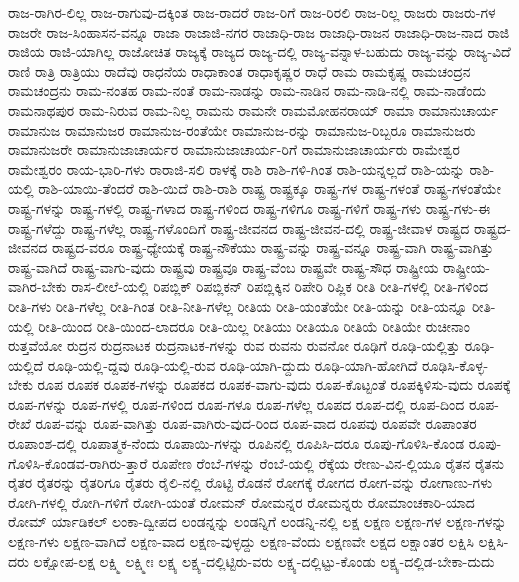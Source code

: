 {ರಾಜ-ರಾಗಿರ-ಲಿಲ್ಲ
ರಾಜ-ರಾಗುವು-ದಕ್ಕಿಂತ
ರಾಜ-ರಾದರೆ
ರಾಜ-ರಿಗೆ
ರಾಜ-ರಿರಲಿ
ರಾಜ-ರಿಲ್ಲ
ರಾಜರು
ರಾಜರು-ಗಳ
ರಾಜರೇ
ರಾಜ-ಸಿಂಹಾಸನ-ವನ್ನೂ
ರಾಜಾ
ರಾಜಾಜಿ-ನಗರ
ರಾಜಾಧಿ-ರಾಜ
ರಾಜಾಧಿ-ರಾಜನ
ರಾಜಾಧಿ-ರಾಜ-ನಾದ
ರಾಜಿ
ರಾಜಿಯ
ರಾಜಿ-ಯಾಗಿಲ್ಲ
ರಾಜೋಚಿತ
ರಾಜ್ಯಕ್ಕೆ
ರಾಜ್ಯದ
ರಾಜ್ಯ-ದಲ್ಲಿ
ರಾಜ್ಯ-ವನ್ನಾಳ-ಬಹುದು
ರಾಜ್ಯ-ವನ್ನು
ರಾಜ್ಯ-ವಿದೆ
ರಾಣಿ
ರಾತ್ರಿ
ರಾತ್ರಿಯು
ರಾದೆವು
ರಾಧನೆಯ
ರಾಧಾಕಾಂತ
ರಾಧಾಕೃಷ್ಣರ
ರಾಧೆ
ರಾಮ
ರಾಮಕೃಷ್ಣ
ರಾಮಚಂದ್ರನ
ರಾಮಚಂದ್ರನು
ರಾಮ-ನಂತಹ
ರಾಮ-ನಂತೆ
ರಾಮ-ನಾಡನ್ನು
ರಾಮ-ನಾಡಿನ
ರಾಮ-ನಾಡಿ-ನಲ್ಲಿ
ರಾಮ-ನಾಡೆಂದು
ರಾಮನಾಥಪುರ
ರಾಮ-ನಿರುವ
ರಾಮ-ನಿಲ್ಲ
ರಾಮನು
ರಾಮನೇ
ರಾಮಮೋಹನರಾಯ್
ರಾಮಾ
ರಾಮಾನುಚಾರ್ಯ
ರಾಮಾನುಜ
ರಾಮಾನುಜರ
ರಾಮಾನುಜ-ರಂತೆಯೇ
ರಾಮಾನುಜ-ರನ್ನು
ರಾಮಾನುಜ-ರಿಬ್ಬರೂ
ರಾಮಾನುಜರು
ರಾಮಾನುಜರೇ
ರಾಮಾನುಜಾಚಾರ್ಯರ
ರಾಮಾನುಜಾಚಾರ್ಯ-ರಿಗೆ
ರಾಮಾನುಜಾಚಾರ್ಯರು
ರಾಮೇಶ್ವರ
ರಾಮೇಶ್ವರಂ
ರಾಯ-ಭಾರಿ-ಗಳು
ರಾರಾಜಿ-ಸಲಿ
ರಾಳಕ್ಕೆ
ರಾಶಿ
ರಾಶಿ-ಗಳಿ-ಗಿಂತ
ರಾಶಿ-ಯನ್ನಲ್ಲದೆ
ರಾಶಿ-ಯನ್ನು
ರಾಶಿ-ಯಲ್ಲಿ
ರಾಶಿ-ಯಾಯಿ-ತೆಂದರೆ
ರಾಶಿ-ಯಿದೆ
ರಾಶಿ-ರಾಶಿ
ರಾಷ್ಟ್ರ
ರಾಷ್ಟ್ರಕ್ಕೂ
ರಾಷ್ಟ್ರ-ಗಳ
ರಾಷ್ಟ್ರ-ಗಳಂತೆ
ರಾಷ್ಟ್ರ-ಗಳಂತೆಯೇ
ರಾಷ್ಟ್ರ-ಗಳನ್ನು
ರಾಷ್ಟ್ರ-ಗಳಲ್ಲಿ
ರಾಷ್ಟ್ರ-ಗಳಾದ
ರಾಷ್ಟ್ರ-ಗಳಿಂದ
ರಾಷ್ಟ್ರ-ಗಳಿಗೂ
ರಾಷ್ಟ್ರ-ಗಳಿಗೆ
ರಾಷ್ಟ್ರ-ಗಳು
ರಾಷ್ಟ್ರ-ಗಳು-ಈ
ರಾಷ್ಟ್ರ-ಗಳೆದ್ದು
ರಾಷ್ಟ್ರ-ಗಳೆಲ್ಲ
ರಾಷ್ಟ್ರ-ಗಳೊಂದಿಗೆ
ರಾಷ್ಟ್ರ-ಜೀವನದ
ರಾಷ್ಟ್ರ-ಜೀವನ-ದಲ್ಲಿ
ರಾಷ್ಟ್ರ-ಜೀವಾಳ
ರಾಷ್ಟ್ರದ
ರಾಷ್ಟ್ರದ-ಜೀವನದ
ರಾಷ್ಟ್ರದ-ವರೂ
ರಾಷ್ಟ್ರ-ಧ್ಯೇಯಕ್ಕೆ
ರಾಷ್ಟ್ರ-ನೌಕೆಯು
ರಾಷ್ಟ್ರ-ವನ್ನು
ರಾಷ್ಟ್ರ-ವನ್ನೂ
ರಾಷ್ಟ್ರ-ವಾಗಿ
ರಾಷ್ಟ್ರ-ವಾಗಿತ್ತು
ರಾಷ್ಟ್ರ-ವಾಗಿದೆ
ರಾಷ್ಟ್ರ-ವಾಗು-ವುದು
ರಾಷ್ಟ್ರವು
ರಾಷ್ಟ್ರವೂ
ರಾಷ್ಟ್ರ-ವೆಂಬ
ರಾಷ್ಟ್ರವೇ
ರಾಷ್ಟ್ರ-ಸೌಧ
ರಾಷ್ಟ್ರೀಯ
ರಾಷ್ಟ್ರೀಯ-ವಾಗಿರ-ಬೇಕು
ರಾಸ-ಲೀಲೆ-ಯಲ್ಲಿ
ರಿಪಬ್ಲಿಕ್
ರಿಪಬ್ಲಿಕನ್
ರಿಪಬ್ಲಿಕ್ಕಿನ
ರಿಪೇರಿ
ರಿಪ್ಲಿಕ
ರೀತಿ
ರೀತಿ-ಗಳಲ್ಲಿ
ರೀತಿ-ಗಳಿಂದ
ರೀತಿ-ಗಳು
ರೀತಿ-ಗಳೆಲ್ಲ
ರೀತಿ-ಗಿಂತ
ರೀತಿ-ನೀತಿ-ಗಳೆಲ್ಲ
ರೀತಿಯ
ರೀತಿ-ಯಂತೆಯೇ
ರೀತಿ-ಯನ್ನು
ರೀತಿ-ಯನ್ನೂ
ರೀತಿ-ಯಲ್ಲಿ
ರೀತಿ-ಯಿಂದ
ರೀತಿ-ಯಿಂದ-ಲಾದರೂ
ರೀತಿ-ಯಿಲ್ಲ
ರೀತಿಯು
ರೀತಿಯೂ
ರೀತಿಯೆ
ರೀತಿಯೇ
ರುಚೀನಾಂ
ರುತ್ತವೆಯೋ
ರುದ್ರನ
ರುದ್ರನಾಟಕ
ರುದ್ರನಾಟಕ-ಗಳನ್ನು
ರುವ
ರುವನು
ರುವನೋ
ರೂಢಿಗೆ
ರೂಢಿ-ಯಲ್ಲಿತ್ತು
ರೂಢಿ-ಯಲ್ಲಿದೆ
ರೂಢಿ-ಯಲ್ಲಿ-ದ್ದವು
ರೂಢಿ-ಯಲ್ಲಿ-ರುವ
ರೂಢಿ-ಯಾಗಿ-ದ್ದುದು
ರೂಢಿ-ಯಾಗಿ-ಹೋಗಿದೆ
ರೂಢಿಸಿ-ಕೊಳ್ಳ-ಬೇಕು
ರೂಪ
ರೂಪಕ
ರೂಪಕ-ಗಳನ್ನು
ರೂಪಕದ
ರೂಪಕ-ವಾಗು-ವುದು
ರೂಪ-ಕೊಟ್ಟಂತೆ
ರೂಪಕ್ಕಿಳಿಸು-ವುದು
ರೂಪಕ್ಕೆ
ರೂಪ-ಗಳನ್ನು
ರೂಪ-ಗಳಲ್ಲಿ
ರೂಪ-ಗಳಿಂದ
ರೂಪ-ಗಳೂ
ರೂಪ-ಗಳೆಲ್ಲ
ರೂಪದ
ರೂಪ-ದಲ್ಲಿ
ರೂಪ-ದಿಂದ
ರೂಪ-ರೇಖೆ
ರೂಪ-ವನ್ನು
ರೂಪ-ವಾಗಿತ್ತು
ರೂಪ-ವಾಗಿರು-ವುದ-ರಿಂದ
ರೂಪ-ವಾದ
ರೂಪವು
ರೂಪವೇ
ರೂಪಾಂತರ
ರೂಪಾಂಶ-ದಲ್ಲಿ
ರೂಪಾತ್ಮಕ-ನೆಂದು
ರೂಪಾಯಿ-ಗಳನ್ನು
ರೂಪಿನಲ್ಲಿ
ರೂಪಿಸಿ-ದರೂ
ರೂಪು-ಗೊಳಿಸಿ-ಕೊಂಡ
ರೂಪು-ಗೊಳಿಸಿ-ಕೊಂಡವ-ರಾಗಿರು-ತ್ತಾರೆ
ರೂಪೇಣ
ರೆಂಬೆ-ಗಳನ್ನು
ರೆಂಬೆ-ಯಲ್ಲಿ
ರೆಕ್ಕೆಯ
ರೇಣು-ವಿನ-ಲ್ಲಿಯೂ
ರೈತನ
ರೈತನು
ರೈತರ
ರೈತರನ್ನು
ರೈತರಿಗೂ
ರೈತರು
ರೈಲಿ-ನಲ್ಲಿ
ರೊಟ್ಟಿ
ರೊಡನೆ
ರೋಗಕ್ಕೆ
ರೋಗದ
ರೋಗ-ವನ್ನು
ರೋಗಾಣು-ಗಳು
ರೋಗಿ-ಗಳಲ್ಲಿ
ರೋಗಿ-ಗಳಿಗೆ
ರೋಗಿ-ಯಂತೆ
ರೋಮನ್
ರೋಮನ್ನರ
ರೋಮನ್ನರು
ರೋಮಾಂಚಕಾರಿ-ಯಾದ
ರೋಮ್
ರ್ಯಾಡಿಕಲ್
ಲಂಕಾ-ದ್ವೀಪದ
ಲಂಡನ್ನನ್ನು
ಲಂಡನ್ನಿಗೆ
ಲಂಡನ್ನಿ-ನಲ್ಲಿ
ಲಕ್ಷ
ಲಕ್ಷಣ
ಲಕ್ಷಣ-ಗಳ
ಲಕ್ಷಣ-ಗಳನ್ನು
ಲಕ್ಷಣ-ಗಳು
ಲಕ್ಷಣ-ವಾಗಿದೆ
ಲಕ್ಷಣ-ವಾದ
ಲಕ್ಷಣ-ವುಳ್ಳದ್ದು
ಲಕ್ಷಣ-ವೆಂದು
ಲಕ್ಷಣವೇ
ಲಕ್ಷದ
ಲಕ್ಷಾಂತರ
ಲಕ್ಷಿಸಿ
ಲಕ್ಷಿಸಿ-ದರು
ಲಕ್ಷೋಪ-ಲಕ್ಷ
ಲಕ್ಷ್ಮಿ
ಲಕ್ಷ್ಮೀಃ
ಲಕ್ಷ್ಯ
ಲಕ್ಷ್ಯ-ದಲ್ಲಿಟ್ಟಿರು-ವರು
ಲಕ್ಷ್ಯ-ದಲ್ಲಿಟ್ಟು-ಕೊಂಡು
ಲಕ್ಷ್ಯ-ದಲ್ಲಿಡ-ಬೇಕಾ-ದುದು
}
